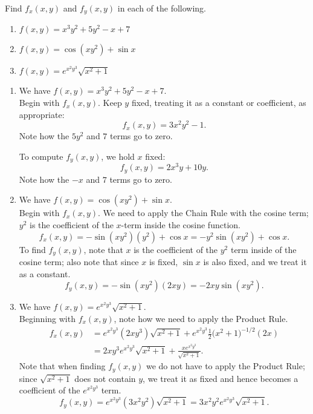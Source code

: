 \begin{example}\label{ex_partial2}
Find $f_x(x,y)$ and $f_y(x,y)$ in each of the following.
\begin{enumerate}
	\item $f(x,y) = x^3y^2+ 5y^2-x+7$
	\item	$f(x,y) = \cos(xy^2)+\sin x$
	\item	$f(x,y) = e^{x^2y^3}\sqrt{x^2+1}$
\end{enumerate}
\solution
\begin{enumerate}
	\item We have $f(x,y) = x^3y^2+ 5y^2-x+7$.\\
	Begin with $f_x(x,y)$. Keep $y$ fixed, treating it as a constant or coefficient, as appropriate:
	\[f_x(x,y) = 3x^2y^2-1.\]
	Note how the $5y^2$ and $7$ terms go to zero.
	
	To compute $f_y(x,y)$, we hold $x$ fixed:
	\[f_y(x,y) = 2x^3y+10y.\]
	Note how the $-x$ and $7$ terms go to zero.
	
	\item We have $f(x,y) = \cos(xy^2)+\sin x$.\\
	Begin with $f_x(x,y)$. We need to apply the Chain Rule with the cosine term; $y^2$ is the coefficient of the $x$-term inside the cosine function.
	\[f_x(x,y) = -\sin(xy^2)(y^2)+\cos x = -y^2\sin(xy^2)+\cos x.\]
	To find $f_y(x,y)$, note that $x$ is the coefficient of the $y^2$ term inside of the cosine term; also note that since $x$ is fixed, $\sin x$ is also fixed, and we treat it as a constant.
	\[f_y(x,y) = -\sin(xy^2)(2xy) = -2xy\sin(xy^2).\]
	
	\item		We have $f(x,y) = e^{x^2y^3}\sqrt{x^2+1}$.\\
	Beginning with $f_x(x,y)$, note how we need to apply the Product Rule. 
	\begin{align*}
	f_x(x,y) &= e^{x^2y^3}(2xy^3)\sqrt{x^2+1} + e^{x^2y^3}\frac12\bigl(x^2+1\bigr)^{-1/2}(2x) \\
					&= 2xy^3e^{x^2y^3}\sqrt{x^2+1}+\frac{x e^{x^2y^3}}{\sqrt{x^2+1}}.
	\end{align*}
	Note that when finding $f_y(x,y)$ we do not have to apply the Product Rule; since $\sqrt{x^2+1}$ does not contain $y$, we treat it as fixed and hence becomes a coefficient of the $e^{x^2y^3}$ term.
	\[f_y(x,y) = e^{x^2y^3}(3x^2y^2)\sqrt{x^2+1} = 3x^2y^2e^{x^2y^3}\sqrt{x^2+1}.\]
\end{enumerate}
\end{example}

